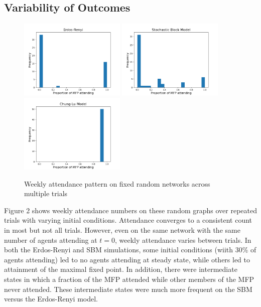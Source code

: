 \documentclass[12pt]{article}
\begin{document}
\subsection{Variability of Outcomes}
\begin{figure}[h!]
  \includegraphics[width=0.45\textwidth]{gnp_attendance.png}
  \includegraphics[width=0.45\textwidth]{sbm_attendance.png}
  \includegraphics[width=0.45\textwidth]{cm_attendance.png}
  \caption{Weekly attendance pattern on fixed random networks across multiple trials}
\end{figure}

Figure 2 shows weekly attendance numbers on these random graphs over repeated trials with varying initial conditions.  Attendance converges to a consistent count in most but not all trials.  However, even on the same network with the same number of agents attending at $t=0$, weekly attendance varies between trials.  In both the Erdos-Renyi and SBM simulations, some initial conditions (wiith 30\% of agents attending) led to no agents attending at steady state, while others led to attainment of the maximal fixed point.  In addition, there were intermediate states in which a fraction of the MFP attended while other members of the MFP never attended.  These intermediate states were much more frequent on the SBM versus the Erdos-Renyi model. 
\end{document}
